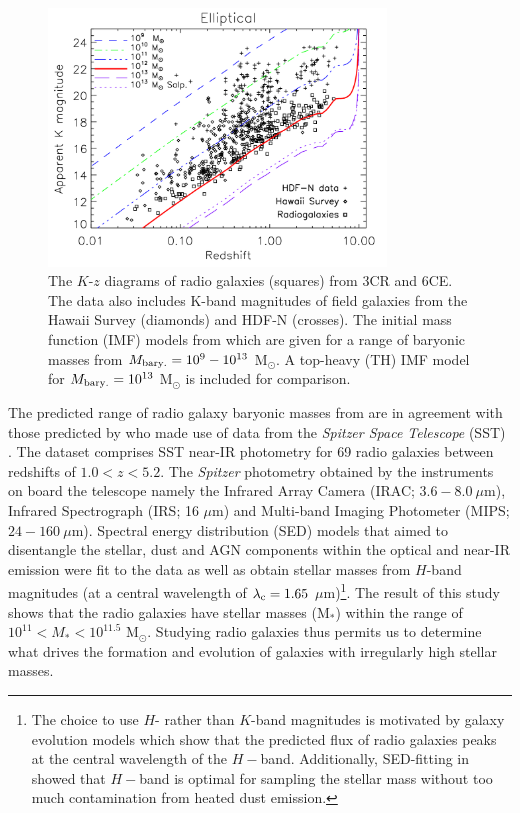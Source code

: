 \documentclass[10pt,a4paper]{article}
\begin{document}
\begin{figure}[!ht]
  \centering
  \includegraphics[width=0.8\textwidth]{plots_chp1/K_z_Rocca-Volmerange_2004_pegase.png}
  \caption{The $K$-$z$ diagrams of radio galaxies (squares) from 3CR and 6CE. The data also includes K-band magnitudes of field galaxies from the Hawaii Survey \citep{Songaila1994} (diamonds) and HDF-N \citep[Hubble Deep Field-North;][]{Dickinson2003} (crosses). The initial mass function (IMF) models from \citet{RanaBasu1992} which are given for a range of baryonic masses from $M_{\rm bary.} = 10^9 - 10^{13}$ M$_\odot.$ A top-heavy (TH) IMF model for $M_{\rm bary.} = 10^{13}$ M$_\odot$ is included for comparison.}
  \label{fig:K-z-rocca-volmerange2004-pegase}
\end{figure}

The predicted range of radio galaxy baryonic masses from \citet{rocca-volmerange2004} are in agreement with those predicted by \citet{seymour2007} who made use of data from the {\it Spitzer Space Telescope} (SST) \citep{Werner2004}. The dataset comprises SST near-IR photometry for 69 radio galaxies between redshifts of $1.0 < z < 5.2.$ The {\it Spitzer} photometry obtained by the instruments on board the telescope namely the Infrared Array Camera (IRAC; $3.6-8.0~\mu$m), Infrared Spectrograph (IRS; 16 $\mu$m) and Multi-band Imaging Photometer (MIPS; $24-160~\mu$m). Spectral energy distribution (SED) models that aimed to disentangle the stellar, dust and AGN components within the optical and near-IR emission were fit to the data as well as obtain stellar masses from $H$-band magnitudes (at a central wavelength of $\lambda_{\rm c} = 1.65$ $\mu$m)\footnote{The choice to use $H$- rather than $K$-band magnitudes is motivated by galaxy evolution models which show that the predicted flux of radio galaxies peaks at the central wavelength of the $H-$band. Additionally, SED-fitting in \citet{Drouart2012} showed that $H-$band is optimal for sampling the stellar mass without too much contamination from heated dust emission.}. The result of this study shows that the radio galaxies have stellar masses (M$_*$) within the range of $10^{11} < M_* < 10^{11.5}$ M$_\odot.$ Studying radio galaxies thus permits us to determine what drives the formation and evolution of galaxies with irregularly high stellar masses. 
\end{document}
